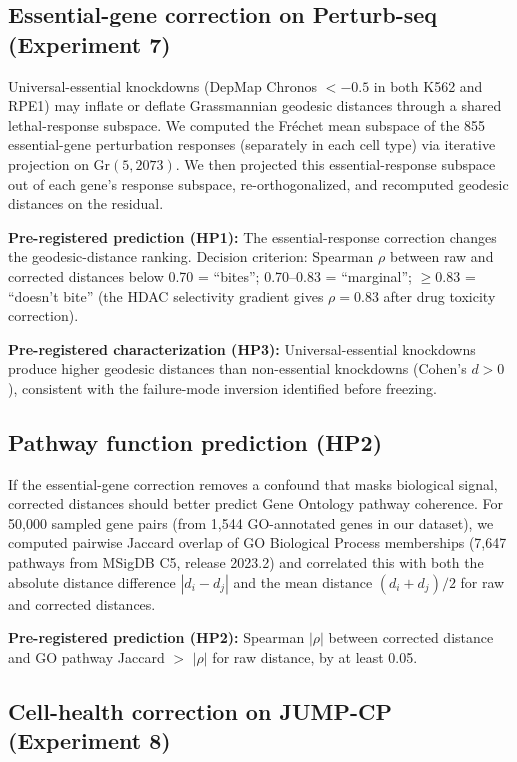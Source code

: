 \documentclass{article}
\begin{document}
\subsection{Essential-gene correction on Perturb-seq (Experiment 7)}

Universal-essential knockdowns (DepMap Chronos $< -0.5$ in both K562 and
RPE1) may inflate or deflate Grassmannian geodesic distances through a
shared lethal-response subspace. We computed the Fr\'echet mean subspace of
the 855 essential-gene perturbation responses (separately in each cell type)
via iterative projection on Gr$(5, 2073)$. We then projected this
essential-response subspace out of each gene's response subspace,
re-orthogonalized, and recomputed geodesic distances on the residual.

\textbf{Pre-registered prediction (HP1):} The essential-response correction
changes the geodesic-distance ranking. Decision criterion: Spearman $\rho$
between raw and corrected distances below 0.70 = ``bites''; 0.70--0.83 =
``marginal''; $\geq 0.83$ = ``doesn't bite'' (the HDAC selectivity
gradient gives $\rho = 0.83$ after drug toxicity correction).

\textbf{Pre-registered characterization (HP3):} Universal-essential
knockdowns produce higher geodesic distances than non-essential knockdowns
(Cohen's $d > 0$), consistent with the failure-mode inversion identified
before freezing.

\subsection{Pathway function prediction (HP2)}

If the essential-gene correction removes a confound that masks biological
signal, corrected distances should better predict Gene Ontology pathway
coherence. For 50{,}000 sampled gene pairs (from 1{,}544 GO-annotated genes
in our dataset), we computed pairwise Jaccard overlap of GO Biological
Process memberships (7{,}647 pathways from MSigDB C5, release 2023.2) and
correlated this with both the absolute distance difference $|d_i - d_j|$
and the mean distance $(d_i + d_j)/2$ for raw and corrected distances.

\textbf{Pre-registered prediction (HP2):} Spearman $|\rho|$ between corrected
distance and GO pathway Jaccard $>$ $|\rho|$ for raw distance, by at least
0.05.

\subsection{Cell-health correction on JUMP-CP (Experiment 8)}
\end{document}
